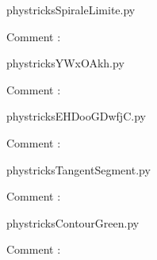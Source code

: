     \clearpage
    


    \newcommand{\CaptionFigSpiraleLimite}{<+Type your caption here+>}
    \begin{center}
        
    \end{center}
    phystricksSpiraleLimite.py

    Comment : 

    \clearpage
    


    \newcommand{\CaptionFigYWxOAkh}{<+Type your caption here+>}
    \begin{center}
        
    \end{center}
    phystricksYWxOAkh.py

    Comment : 

    \clearpage
    


    \newcommand{\CaptionFigEHDooGDwfjC}{<+Type your caption here+>}
    \begin{center}
        
    \end{center}
    phystricksEHDooGDwfjC.py

    Comment : 

    \clearpage
    


    \newcommand{\CaptionFigTangentSegment}{<+Type your caption here+>}
    \begin{center}
        
    \end{center}
    phystricksTangentSegment.py

    Comment : 

    \clearpage
    


    \newcommand{\CaptionFigContourGreen}{<+Type your caption here+>}
    \begin{center}
        
    \end{center}
    phystricksContourGreen.py

    Comment : 

    \clearpage
    


